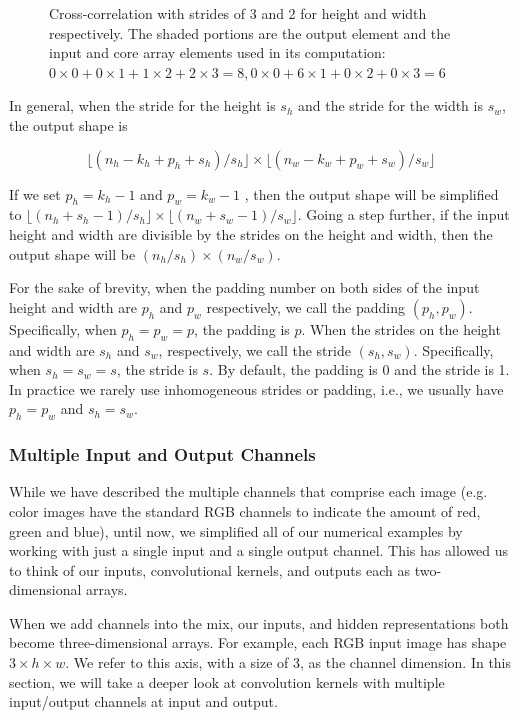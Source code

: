 \begin{figure}[hpt]
    \centering
    
    \caption{Cross-correlation with strides of 3 and 2 for height and width respectively. The shaded portions are the output element and the input and core array elements used in its computation: $0\times0+0\times1+1\times2+2\times3=8,  0\times0+6\times1+0\times2+0\times3=6$}
    \label{fig:conv_stride}
\end{figure}

In general, when the stride for the height is $s_h$  and the stride for the width is $s_w $, the output shape is

$$\lfloor(n_h-k_h+p_h+s_h)/s_h\rfloor \times \lfloor(n_w-k_w+p_w+s_w)/s_w\rfloor$$
 
If we set $p_h=k_h-1$  and  $p_w=k_w-1$ , then the output shape will be simplified to $\lfloor(n_h+s_h-1)/s_h\rfloor \times \lfloor(n_w+s_w-1)/s_w\rfloor$. Going a step further, if the input height and width are divisible by the strides on the height and width, then the output shape will be $(n_h/s_h)\times(n_w/s_w)$.

For the sake of brevity, when the padding number on both sides of the input height and width are $p_h$  and $p_w$  respectively, we call the padding $(p_h,p_w)$. Specifically, when  $p_h=p_w=p$, the padding is $p$. When the strides on the height and width are $s_h$ and $s_w$, respectively, we call the stride $(s_h,s_w)$. Specifically, when $s_h=s_w=s$, the stride is $s$. By default, the padding is 0 and the stride is 1. In practice we rarely use inhomogeneous strides or padding, i.e., we usually have $p_h=p_w$ and $s_h=s_w$.

\subsubsection{Multiple Input and Output Channels}

While we have described the multiple channels that comprise each image (e.g. color images have the standard RGB channels to indicate the amount of red, green and blue), until now, we simplified all of our numerical examples by working with just a single input and a single output channel. This has allowed us to think of our inputs, convolutional kernels, and outputs each as two-dimensional arrays.

When we add channels into the mix, our inputs, and hidden representations both become three-dimensional arrays. For example, each RGB input image has shape $3\times h\times w$. We refer to this axis, with a size of 3, as the channel dimension. In this section, we will take a deeper look at convolution kernels with multiple input/output channels at input and output.

